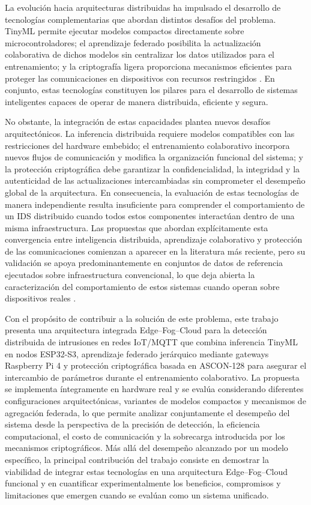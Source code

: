 \documentclass[journal,article,submit,moreauthors]{Definitions/mdpi}
\begin{document}
La evolución hacia arquitecturas distribuidas ha impulsado el desarrollo de tecnologías complementarias que abordan distintos desafíos del problema. TinyML permite ejecutar modelos compactos directamente sobre microcontroladores; el aprendizaje federado posibilita la actualización colaborativa de dichos modelos sin centralizar los datos utilizados para el entrenamiento; y la criptografía ligera proporciona mecanismos eficientes para proteger las comunicaciones en dispositivos con recursos restringidos \cite{Tekin2023,Amuthadevi2025,McMahan2017,Imteaj2022,NIST800232,Kaur2025}. En conjunto, estas tecnologías constituyen los pilares para el desarrollo de sistemas inteligentes capaces de operar de manera distribuida, eficiente y segura.

No obstante, la integración de estas capacidades plantea nuevos desafíos arquitectónicos. La inferencia distribuida requiere modelos compatibles con las restricciones del hardware embebido; el entrenamiento colaborativo incorpora nuevos flujos de comunicación y modifica la organización funcional del sistema; y la protección criptográfica debe garantizar la confidencialidad, la integridad y la autenticidad de las actualizaciones intercambiadas sin comprometer el desempeño global de la arquitectura. En consecuencia, la evaluación de estas tecnologías de manera independiente resulta insuficiente para comprender el comportamiento de un IDS distribuido cuando todos estos componentes interactúan dentro de una misma infraestructura. Las propuestas que abordan explícitamente esta convergencia entre inteligencia distribuida, aprendizaje colaborativo y protección de las comunicaciones comienzan a aparecer en la literatura más reciente, pero su validación se apoya predominantemente en conjuntos de datos de referencia ejecutados sobre infraestructura convencional, lo que deja abierta la caracterización del comportamiento de estos sistemas cuando operan sobre dispositivos reales \cite{Alshammari2026,Dritsas2025}.

Con el propósito de contribuir a la solución de este problema, este trabajo presenta una arquitectura integrada Edge--Fog--Cloud para la detección distribuida de intrusiones en redes IoT/MQTT que combina inferencia TinyML en nodos ESP32-S3, aprendizaje federado jerárquico mediante gateways Raspberry Pi 4 y protección criptográfica basada en ASCON-128 para asegurar el intercambio de parámetros durante el entrenamiento colaborativo. La propuesta se implementa íntegramente en hardware real y se evalúa considerando diferentes configuraciones arquitectónicas, variantes de modelos compactos y mecanismos de agregación federada, lo que permite analizar conjuntamente el desempeño del sistema desde la perspectiva de la precisión de detección, la eficiencia computacional, el costo de comunicación y la sobrecarga introducida por los mecanismos criptográficos. Más allá del desempeño alcanzado por un modelo específico, la principal contribución del trabajo consiste en demostrar la viabilidad de integrar estas tecnologías en una arquitectura Edge--Fog--Cloud funcional y en cuantificar experimentalmente los beneficios, compromisos y limitaciones que emergen cuando se evalúan como un sistema unificado.
\end{document}
